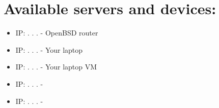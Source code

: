 \documentclass[a4paper,11pt,notitlepage]{report}
\begin{document}
\section*{\color{titlecolor}Available servers and devices:}
\begin{itemize}
\item IP: \hskip 15mm .\hskip 15mm .\hskip 15mm .\hskip 15mm - OpenBSD router
\item IP: \hskip 15mm .\hskip 15mm .\hskip 15mm .\hskip 15mm - Your laptop
\item IP: \hskip 15mm .\hskip 15mm .\hskip 15mm .\hskip 15mm - Your laptop VM
\item IP: \hskip 15mm .\hskip 15mm .\hskip 15mm .\hskip 15mm -
\item IP: \hskip 15mm .\hskip 15mm .\hskip 15mm .\hskip 15mm -
\end{itemize}



%



\end{document}
